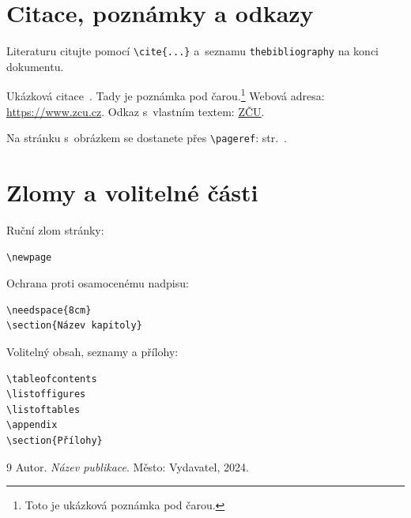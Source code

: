 \section{Citace, poznámky a odkazy}

Literaturu citujte pomocí \texttt{\textbackslash cite\{...\}} a~seznamu
\texttt{thebibliography} na konci dokumentu.

Ukázková citace~\cite{ref:ukazka}. Tady je poznámka pod
čarou.\footnote{Toto je ukázková poznámka pod čarou.}
Webová adresa: \url{https://www.zcu.cz}. Odkaz s~vlastním textem:
\href{https://www.zcu.cz}{ZČU}.

Na stránku s~obrázkem se dostanete přes \texttt{\textbackslash pageref}:
str.~\pageref{obr:ukazka}.

\section{Zlomy a volitelné části}

Ruční zlom stránky:

\begin{verbatim}
\newpage
\end{verbatim}

Ochrana proti osamocenému nadpisu:

\begin{verbatim}
\needspace{8cm}
\section{Název kapitoly}
\end{verbatim}

Volitelný obsah, seznamy a přílohy:

\begin{verbatim}
\tableofcontents
\listoffigures
\listoftables
\appendix
\section{Přílohy}
\end{verbatim}

\renewcommand{\refname}{Použitá literatura}
\begin{thebibliography}{9}
  Autor. \textit{Název publikace}. Město: Vydavatel, 2024.
\end{thebibliography}


